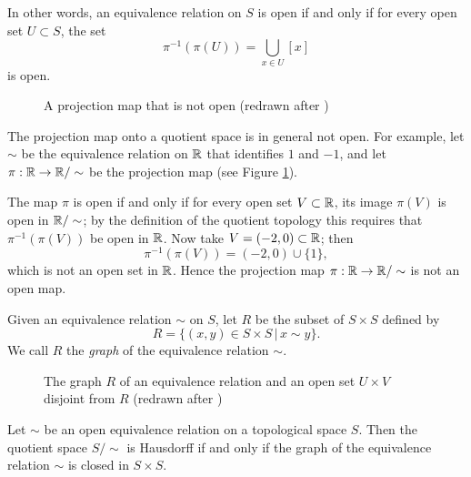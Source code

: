 In other words, an equivalence relation on $S$ is open if and only if for
every open set $U\subset S$, the set
\begin{displaymath}
	\pi^{-1}(\pi(U)) = \bigcup_{x\in U}[x]
\end{displaymath}
is open.

\begin{figure}[ht]
	\centering
	\caption{A projection map that is not open (redrawn after
		\cite{tu_introduction_2011})}
	\label{fig:projective-is-not-open}
\end{figure}

\begin{example}

	The projection map onto a quotient space is in general not open. For
	example, let $\sim$ be the equivalence relation on $\mathbb R$ that identifies
	$1$ and $-1$, and let $\pi:\mathbb R\to\mathbb R/\sim$ be the projection map (see
	Figure \ref{fig:projective-is-not-open}).

	The map $\pi$ is open if and only if for every open set
	$V\subset\mathbb R$, its image $\pi(V)$ is open in $\mathbb R/\sim$; by the
	definition of the quotient topology this requires that
	$\pi^{-1}(\pi(V))$ be open in $\mathbb R$. Now take $V=(-2,0)\subset\mathbb R$; then
	\begin{displaymath}
		\pi^{-1}(\pi(V)) = (-2,0)\cup \{1\},
	\end{displaymath}
	which is not an open set in $\mathbb R$. Hence the projection map
	$\pi:\mathbb R\to\mathbb R/\sim$ is not an open map.

\end{example}

Given an equivalence relation $\sim$ on $S$, let $R$ be the subset of $S\times
	S$ defined by
\begin{displaymath}
	R=\{(x,y)\in S\times S\, |\, x\sim y\}.
\end{displaymath}
We call $R$ the \emph{graph} of the equivalence relation $\sim$.


\begin{figure}[ht]
	\centering
	\caption{The graph $R$ of an equivalence relation and an open set
		$U\times V$ disjoint from $R$ (redrawn after
		\cite{tu_introduction_2011})}
	\label{fig:graph-of-equivalence-relation}
\end{figure}

\begin{theorem}
  \label{thm:quotient-be-hausdorff}

	Let $\sim$ be an open equivalence relation on a topological space $S$.
	Then the quotient space $S/\sim$ is Hausdorff if and only if the graph
	of the equivalence relation $\sim$ is closed in $S\times S$.

\end{theorem}

